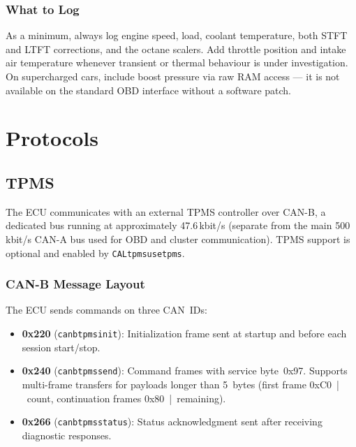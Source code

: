 \documentclass[a4paper,11pt]{article}
\renewcommand{\_}{\oldunderscore\allowbreak}
\begin{document}
\subsubsection*{What to Log}

As a minimum, always log engine speed, load, coolant temperature, both STFT
and LTFT corrections, and the octane scalers. Add throttle position and
intake air temperature whenever transient or thermal behaviour is under
investigation. On supercharged cars, include boost pressure via raw RAM
access --- it is not available on the standard OBD interface without a
software patch.

\section{Protocols}

\subsection{TPMS}

The ECU communicates with an external TPMS controller over CAN-B, a dedicated
bus running at approximately 47.6\,kbit/s (separate from the main 500\,kbit/s
CAN-A bus used for OBD and cluster communication). TPMS support is optional and
enabled by \texttt{CAL\_tpms\_use\_tpms}.

\subsubsection*{CAN-B Message Layout}

The ECU sends commands on three CAN~IDs:

\begin{itemize}
\item \textbf{0x220} (\texttt{can\_b\_tpms\_init}): Initialization frame sent
      at startup and before each session start/stop.
\item \textbf{0x240} (\texttt{can\_b\_tpms\_send}): Command frames with
      service byte~0x97. Supports multi-frame transfers for payloads longer
      than 5~bytes (first frame 0xC0~|~count, continuation frames
      0x80~|~remaining).
\item \textbf{0x266} (\texttt{can\_b\_tpms\_status}): Status acknowledgment
      sent after receiving diagnostic responses.
\end{itemize}
\end{document}
